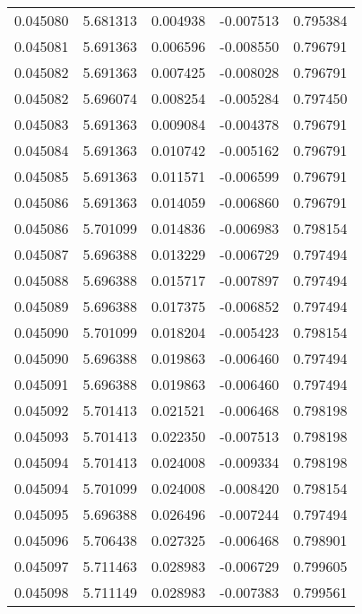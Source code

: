 \begin{tabular}{lrrrr}
0.045080    &  5.681313 &  0.004938 & -0.007513 &             0.795384 \\
0.045081    &  5.691363 &  0.006596 & -0.008550 &             0.796791 \\
0.045082    &  5.691363 &  0.007425 & -0.008028 &             0.796791 \\
0.045082    &  5.696074 &  0.008254 & -0.005284 &             0.797450 \\
0.045083    &  5.691363 &  0.009084 & -0.004378 &             0.796791 \\
0.045084    &  5.691363 &  0.010742 & -0.005162 &             0.796791 \\
0.045085    &  5.691363 &  0.011571 & -0.006599 &             0.796791 \\
0.045086    &  5.691363 &  0.014059 & -0.006860 &             0.796791 \\
0.045086    &  5.701099 &  0.014836 & -0.006983 &             0.798154 \\
0.045087    &  5.696388 &  0.013229 & -0.006729 &             0.797494 \\
0.045088    &  5.696388 &  0.015717 & -0.007897 &             0.797494 \\
0.045089    &  5.696388 &  0.017375 & -0.006852 &             0.797494 \\
0.045090    &  5.701099 &  0.018204 & -0.005423 &             0.798154 \\
0.045090    &  5.696388 &  0.019863 & -0.006460 &             0.797494 \\
0.045091    &  5.696388 &  0.019863 & -0.006460 &             0.797494 \\
0.045092    &  5.701413 &  0.021521 & -0.006468 &             0.798198 \\
0.045093    &  5.701413 &  0.022350 & -0.007513 &             0.798198 \\
0.045094    &  5.701413 &  0.024008 & -0.009334 &             0.798198 \\
0.045094    &  5.701099 &  0.024008 & -0.008420 &             0.798154 \\
0.045095    &  5.696388 &  0.026496 & -0.007244 &             0.797494 \\
0.045096    &  5.706438 &  0.027325 & -0.006468 &             0.798901 \\
0.045097    &  5.711463 &  0.028983 & -0.006729 &             0.799605 \\
0.045098    &  5.711149 &  0.028983 & -0.007383 &             0.799561 \\

\end{tabular}
